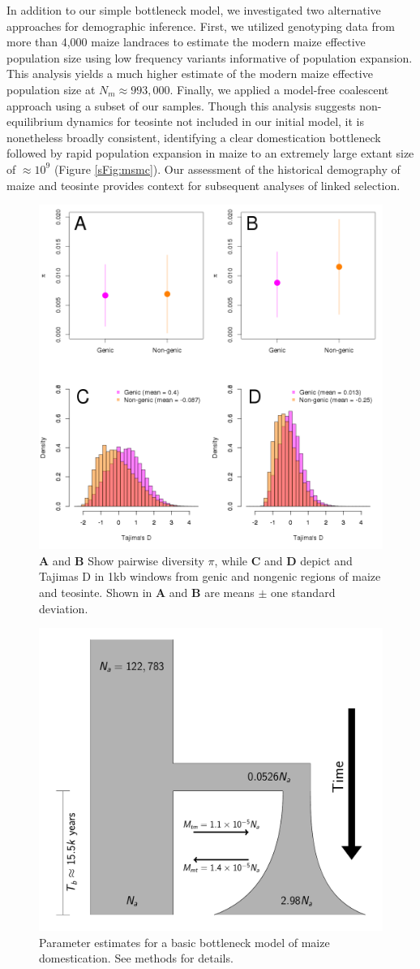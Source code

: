 \documentclass[twoside, twocolumn, letterpaper]{article}
\begin{document}
In addition to our simple bottleneck model, we investigated two alternative approaches for demographic inference.  First, we utilized genotyping data from more than 4,000 maize landraces \cite{Hearne2015} to estimate the modern maize effective population size using low frequency variants  informative of population expansion. 
This analysis yields a much higher estimate of the modern maize effective population size at  $N_m \approx 993,000$.
Finally, we applied a model-free coalescent approach \cite{schiffels2014} using a subset of our samples. 
Though this analysis suggests non-equilibrium dynamics for teosinte not included in our initial model, it is nonetheless broadly consistent, identifying a clear domestication bottleneck followed by rapid population expansion in maize to an extremely large extant size of $\approx 10^9$ (Figure \ref{sFig:msmc}).
Our assessment of the historical demography of maize and teosinte provides context for subsequent analyses of linked selection.


\begin{figure}[!tb]
  \begin{center}
  \includegraphics[width=.45\textwidth] {FigsAndFiles/Pi_and_Tajima.png}
\end{center}
\caption{\textbf{A} and \textbf{B} Show pairwise diversity $\pi$, while \textbf{C} and \textbf{D} depict and Tajimas D in 1kb windows from genic and nongenic regions of maize and teosinte. Shown in \textbf{A} and \textbf{B} are means $\pm$ one standard deviation.   \label{fig:diversity} }
\end{figure}


\begin{figure}[!tb]
\centering
\includegraphics[width=.5\textwidth]{FigsAndFiles/DomesticationModel/domesticationModel.pdf}
\caption{Parameter estimates for a basic bottleneck model of maize domestication. See methods for details. \label{fig:bottleneck} }
\end{figure}
\end{document}
